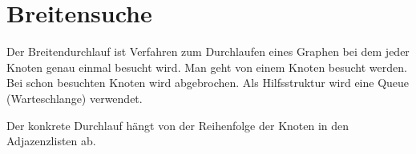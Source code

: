 \documentclass{lehramt-informatik}
\begin{document}

%

\section{Breitensuche}

\begin{quellen}
\item \cite[Seite 53-64 (PDF 46-57)]{aud:fs:6}
\item \cite[Kapitel 6.2.2.2 Graphalgorithmen, Seite 185]{schneider}
\end{quellen}

Der Breitendurchlauf ist Verfahren zum Durchlaufen eines Graphen bei dem
jeder Knoten genau einmal besucht wird. Man geht von einem Knoten
  besucht
werden. Bei schon besuchten Knoten wird abgebrochen. Als Hilfsstruktur
wird eine Queue (Warteschlange) verwendet.

Der konkrete Durchlauf hängt von der Reihenfolge der Knoten in den
Adjazenzlisten ab.

\TmpGraph
\end{document}
